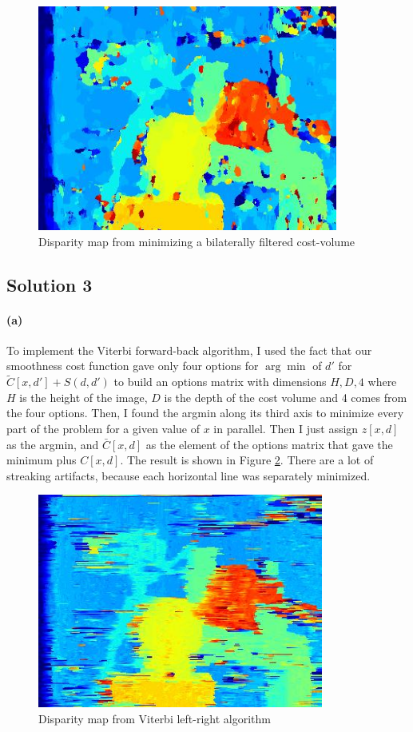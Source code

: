 \documentclass{article}
\newcommand{\solution}[1]{\clearpage \subsection*{Solution #1}}
\newcommand{\spart}[1]{\paragraph{(#1)}}
\begin{document}
\begin{figure}[!h]
	\centering
	\includegraphics[height=20em]{prob2b}
	\caption{Disparity map from minimizing a bilaterally filtered cost-volume}
	\label{fig:p2b}
\end{figure}


\solution{3} 

\spart{a} To implement the Viterbi forward-back algorithm, I used the fact that our smoothness cost function gave only four options for  $\arg\min$ of $d'$ for $\tilde{C}[x,d']+S(d,d')$ to build an options matrix with dimensions $H,D,4$ where $H$ is the height of the image, $D$ is the depth of the cost volume and 4 comes from the four options. Then, I found the argmin along its third axis to minimize every part of the problem for a given value of $x$ in parallel. Then I just assign $z[x,d] $ as the argmin, and $\bar{C}[x,d]$ as the element of the options matrix that gave the minimum plus $C[x,d]$. The result is shown in Figure \ref{fig:p3a}. There are a lot of streaking artifacts, because each horizontal line was separately minimized.

\begin{figure}[!h]
	\centering
	\includegraphics[height=19em]{prob3a}
	\caption{Disparity map from Viterbi left-right algorithm}
	\label{fig:p3a}
\end{figure}
\end{document}
